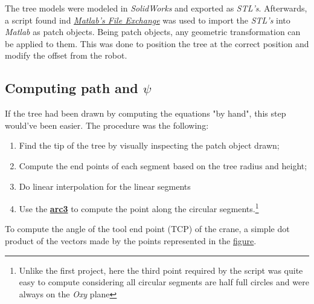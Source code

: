 \documentclass{report}
\begin{document}
The tree models were modeled in \textit{SolidWorks} and exported as
\textit{STL's}. Afterwards, a script found ind
\href{https://www.mathworks.com/matlabcentral/fileexchange/22409-stl-file-reader?s_tid=srchtitle}{\textit{Matlab's
File Exchange}} was used to import the \textit{STL's} into \textit{Matlab} as
patch objects. Being patch objects, any geometric transformation can be applied
to them. This was done to position the tree at the correct position and modify
the offset from the robot.

\subsection{Computing path and $\psi$}

If the tree had been drawn by computing the equations "by hand", this step
would've been easier. The procedure was the following:\begin{enumerate}
    \item Find the tip of the tree by visually inspecting the patch object drawn;
    \item Compute the end points of each segment based on the tree radius and height;
    \item Do linear interpolation for the linear segments
    \item Use the
    \href{https://www.mathworks.com/matlabcentral/fileexchange/123050-3d-arc-passing-through-3-points?s_tid=srchtitle}{\textbf{arc3}}
    to compute the point along the circular segments.\footnote{Unlike the first
    project, here the third point required by the script was quite easy to
    compute considering all circular segments are half full circles and were
    always on the \textit{Oxy} plane}
\end{enumerate}

To compute the angle of the tool end point (TCP) of the crane, a simple dot
product of the vectors made by the points represented in the \hyperref[fig:psi]{figure}.
\end{document}
